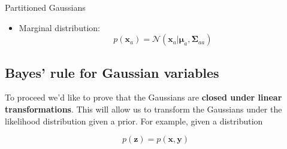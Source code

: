 \begin{frame}{\insertsubsection}
\begin{block}{Partitioned Gaussians}
\begin{itemize}
 \item \textcolor{UniGold}{Marginal distribution:}
 \begin{equation*}
 p\left( \mathbf{x}_a \right) = \mathcal{N} \left( \mathbf{x}_a | \boldsymbol{\mu}_a,\boldsymbol{\Sigma}_{aa} \right)
 \end{equation*}
 \end{itemize}

 \end{block}
 \end{frame}


\subsection{Bayes' rule for Gaussian variables}

\begin{frame}{\insertsubsection}

To proceed we'd like to prove that the Gaussians are \textbf{closed under linear transformations}. This will allow us to transform the Gaussians under the likelihood distribution given a prior. For example, given a distribution

\begin{equation*}
	p(\mathbf{z}) = p(\mathbf{x},\mathbf{y})
\end{equation*}

\end{frame}

\begin{frame}{\insertsubsection}
\end{frame}

